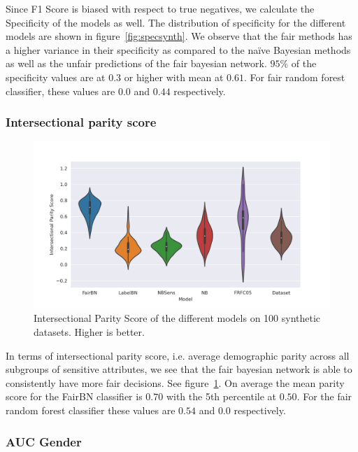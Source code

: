 Since F1 Score is biased with respect to true negatives, we calculate the Specificity of the models as well. The distribution of specificity for the different models are shown in figure~\ref{fig:specsynth}. We observe that the fair methods has a higher variance in their specificity as compared to the naïve Bayesian methods as well as the unfair predictions of the fair bayesian network. $95\%$ of the specificity values are at $0.3$ or higher with mean at $0.61$. For fair random forest classifier, these values are $0.0$ and $0.44$ respectively.

\subsubsection{Intersectional parity score}

\begin{figure}
    \centering
    \includegraphics[width=\linewidth]{figures/intparscore-synthetic.png}
    \caption{Intersectional Parity Score of the different models on 100 synthetic datasets. Higher is better.}
    \label{fig:intpar}
\end{figure}

In terms of intersectional parity score, i.e. average demographic parity across all subgroups of sensitive attributes, we see that the fair bayesian network is able to consistently have more fair decisions. See figure~\ref{fig:intpar}. On average the mean parity score for the FairBN classifier is $0.70$ with the 5th percentile at $0.50$. For the fair random forest classifier these values are $0.54$ and $0.0$ respectively.
 
\subsubsection{AUC Gender}

